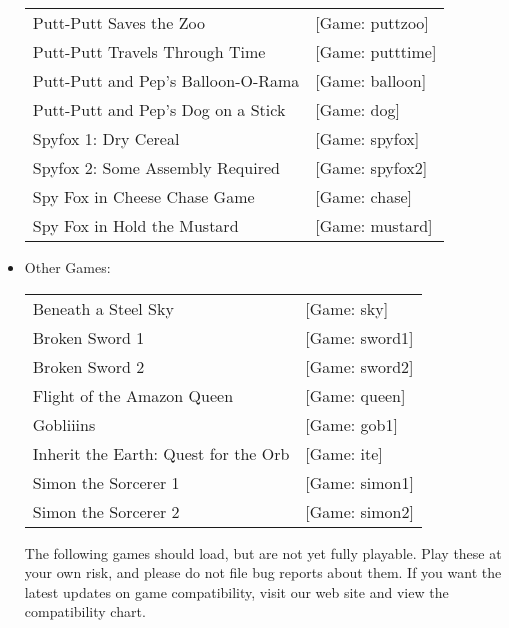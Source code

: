 \begin{itemize}
\begin{tabular}[h]{ll}
    Putt-Putt Saves the Zoo&                                       [Game: puttzoo]\\
    Putt-Putt Travels Through Time&                                [Game: putttime]\\
    Putt-Putt and Pep's Balloon-O-Rama&                            [Game: balloon]\\
    Putt-Putt and Pep's Dog on a Stick&                            [Game: dog]\\
    Spyfox 1: Dry Cereal&                                          [Game: spyfox]\\
    Spyfox 2: Some Assembly Required&                              [Game: spyfox2]\\
    Spy Fox in Cheese Chase Game&                                  [Game: chase]\\
    Spy Fox in Hold the Mustard&                                   [Game: mustard]\\
  \end{tabular}
\item Other Games:\\ 
  \begin{tabular}[h]{ll}
    Beneath a Steel Sky&                           [Game: sky]\\
    Broken Sword 1&                                [Game: sword1]\\
    Broken Sword 2&                               [Game: sword2]\\
    Flight of the Amazon Queen&                    [Game: queen]\\
    Gobliiins&                                     [Game: gob1]\\
    Inherit the Earth: Quest for the Orb&          [Game: ite]\\
     Simon the Sorcerer 1&                         [Game: simon1]\\
     Simon the Sorcerer 2&                         [Game: simon2]\\
  \end{tabular}

  The following games should load, but are not yet fully playable. Play these at your own risk, and please do not file bug reports about them. If you want
the latest updates on game compatibility, visit our web site and view the
compatibility chart.


\end{itemize}
